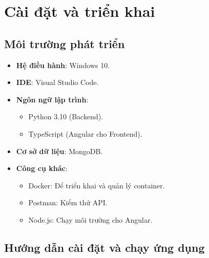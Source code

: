 \chapter{Cài đặt và triển khai}
\section{Môi trường phát triển}
\begin{itemize}
    \item \textbf{Hệ điều hành}: Windows 10.
    \item \textbf{IDE}: Visual Studio Code.
    \item \textbf{Ngôn ngữ lập trình}: 
    \begin{itemize}
        \item Python 3.10 (Backend).
        \item TypeScript (Angular cho Frontend).
    \end{itemize}
    \item \textbf{Cơ sở dữ liệu}: MongoDB.
    \item \textbf{Công cụ khác}:
    \begin{itemize}
        \item Docker: Để triển khai và quản lý container.
        \item Postman: Kiểm thử API.
        \item Node.js: Chạy môi trường cho Angular.
    \end{itemize}
\end{itemize}

\section{Hướng dẫn cài đặt và chạy ứng dụng}
